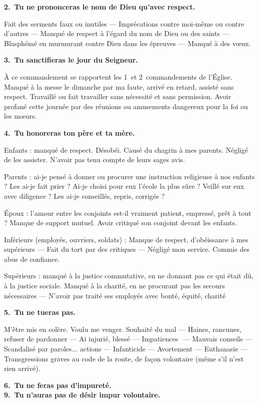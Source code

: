 \documentclass[%
a5paper%
,11pt%
,DIV=15%
,titlepage=on%
,headings=optiontoheadandtoc%
,headings=small%
,parskip=false%
,titlepage%
,openany%
]{scrbook}
\newcommand{\commandement}[1]{\noindent\textbf{#1}}
\begin{document}
\commandement{2. Tu ne prononceras le nom de Dieu qu’avec respect.}

Fait des serments faux ou inutiles — Imprécations contre moi-même ou contre
d’autres — Manqué de respect à l’égard
du nom de Dieu ou des saints — Blasphémé en murmurant contre Dieu dans
les épreuves — Manqué à des vœux.

\commandement{3. Tu sanctifieras le jour du Seigneur.}

À ce commandement se rapportent les 1\ier\ et 2\ieme\ commandements de l’Église.
Manqué à la messe le dimanche par ma faute, arrivé
en retard, assisté sans respect. Travaillé
ou fait travailler sans nécessité et sans
permission. Avoir profané
cette journée par des réunions ou amusements dangereux pour la foi ou les
mœurs.

\commandement{4. Tu honoreras ton père et ta mère.}

Enfants : manqué de respect. Désobéi.
Causé du chagrin à mes parents. Négligé
de les assister. N’avoir pas tenu compte de
leurs sages avis.

Parents : ai-je pensé à donner ou procurer
une instruction religieuse à nos enfants ?
Les ai-je fait prier ? Ai-je choisi pour eux
l’école la plus sûre ? Veillé sur eux avec
diligence ? Les ai-je conseillés, repris,
corrigés ?

Époux : l’amour entre les conjoints est-il
vraiment patient, empressé, prêt à tout ?
Manque de support mutuel. Avoir critiqué
son conjoint devant les enfants.

Inférieurs (employés, ouvriers, soldats) :
Manque de respect, d’obéissance à mes
supérieurs — Fait du tort par des critiques
— Négligé mon service. Commis des abus
de confiance.

Supérieurs : manqué à la justice commutative, en ne donnant pas ce qui était dû, à
la justice sociale. Manqué à la charité, en
ne procurant pas les secours nécessaires
— N’avoir pas traité ses employés avec
bonté, équité, charité

\commandement{5. Tu ne tueras pas.}

M’être mis en colère. Voulu me venger.
Souhaité du mal — Haines, rancunes, refuser de pardonner — Ai injurié, blessé
— Impatiences ­ — Mauvais conseils —
Scandalisé par paroles... actions — Infanticide — Avortement — Euthanasie —
Transgressions graves au code de la route,
de façon volontaire (même s’il n’est rien
arrivé).

\commandement{6. Tu ne feras pas d'impureté.\\
9. Tu n'auras pas de désir impur volontaire.}
\end{document}
